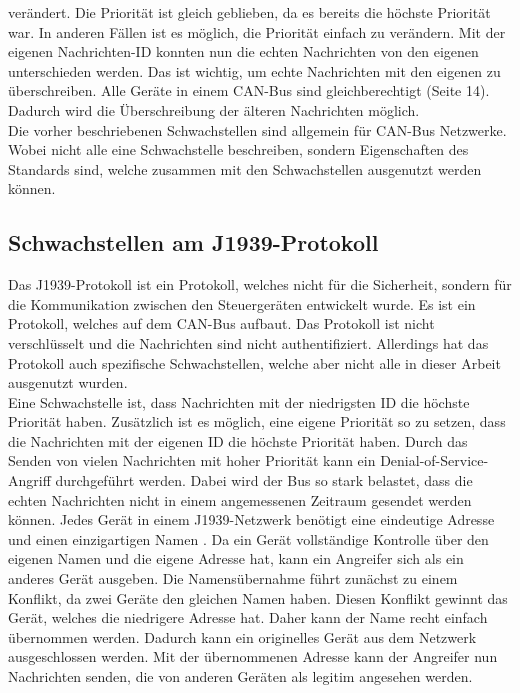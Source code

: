 verändert. Die Priorität ist gleich geblieben, da es bereits die höchste Priorität war. In anderen Fällen ist es möglich, die Priorität
einfach zu verändern. Mit der eigenen Nachrichten-ID konnten nun die 
echten Nachrichten von den eigenen unterschieden werden. Das ist wichtig, um echte Nachrichten mit den eigenen zu überschreiben. 
Alle Geräte in einem CAN-Bus sind gleichberechtigt\cite{Voss2008} (Seite 14). Dadurch wird die Überschreibung der älteren Nachrichten möglich.\\
Die vorher beschriebenen Schwachstellen sind allgemein für CAN-Bus Netzwerke. Wobei nicht alle eine Schwachstelle beschreiben, sondern 
Eigenschaften des Standards sind, welche zusammen mit den Schwachstellen ausgenutzt werden können.\\

\subsection{Schwachstellen am J1939-Protokoll}
Das J1939-Protokoll ist ein Protokoll, welches nicht für die Sicherheit, sondern für die Kommunikation zwischen den Steuergeräten
entwickelt wurde. Es ist ein Protokoll, welches auf dem CAN-Bus aufbaut. Das Protokoll ist nicht verschlüsselt und die Nachrichten
sind nicht authentifiziert. 
Allerdings hat das Protokoll auch spezifische Schwachstellen, welche aber nicht alle in dieser Arbeit ausgenutzt wurden.\\
Eine Schwachstelle ist, dass Nachrichten mit der niedrigsten ID die höchste Priorität haben. Zusätzlich ist es möglich, 
eine eigene Priorität so zu setzen, dass die Nachrichten mit der eigenen ID die höchste Priorität haben. Durch das Senden von
vielen Nachrichten mit hoher Priorität kann ein Denial-of-Service-Angriff durchgeführt werden. Dabei wird der Bus so stark belastet,
dass die echten Nachrichten nicht in einem angemessenen Zeitraum gesendet werden können. Jedes Gerät in einem J1939-Netzwerk
benötigt eine eindeutige Adresse und einen einzigartigen Namen \cite{JungerJ1939}. Da ein Gerät vollständige Kontrolle über 
den eigenen Namen und die eigene Adresse hat, kann ein Angreifer sich als ein anderes Gerät ausgeben. Die Namensübernahme führt
zunächst zu einem Konflikt, da zwei Geräte den gleichen Namen haben. Diesen Konflikt gewinnt das Gerät, welches die niedrigere
Adresse hat. Daher kann der Name recht einfach übernommen werden. Dadurch kann ein originelles Gerät aus dem Netzwerk ausgeschlossen
werden. Mit der übernommenen Adresse kann der Angreifer nun Nachrichten senden, die von anderen Geräten als legitim angesehen werden.
